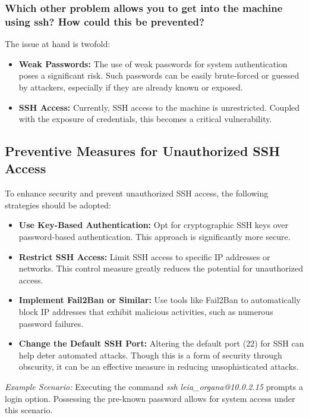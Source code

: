 \subsubsection{Which other problem allows you to get into the machine using ssh? How could this be prevented?}
The issue at hand is twofold:

\begin{itemize}
    \item \textbf{Weak Passwords:} The use of weak passwords for system authentication poses a significant risk. Such passwords can be easily brute-forced or guessed by attackers, especially if they are already known or exposed.

    \item \textbf{SSH Access:} Currently, SSH access to the machine is unrestricted. Coupled with the exposure of credentials, this becomes a critical vulnerability.
\end{itemize}

\subsection*{Preventive Measures for Unauthorized SSH Access}
To enhance security and prevent unauthorized SSH access, the following strategies should be adopted:

\begin{itemize}
    \item \textbf{Use Key-Based Authentication:} Opt for cryptographic SSH keys over password-based authentication. This approach is significantly more secure.

    \item \textbf{Restrict SSH Access:} Limit SSH access to specific IP addresses or networks. This control measure greatly reduces the potential for unauthorized access.

    \item \textbf{Implement Fail2Ban or Similar:} Use tools like Fail2Ban to automatically block IP addresses that exhibit malicious activities, such as numerous password failures.

    \item \textbf{Change the Default SSH Port:} Altering the default port (22) for SSH can help deter automated attacks. Though this is a form of security through obscurity, it can be an effective measure in reducing unsophisticated attacks.
\end{itemize}

\textit{Example Scenario:} Executing the command \textit{ssh leia\_organa@10.0.2.15} prompts a login option. Possessing the pre-known password allows for system access under this scenario.

